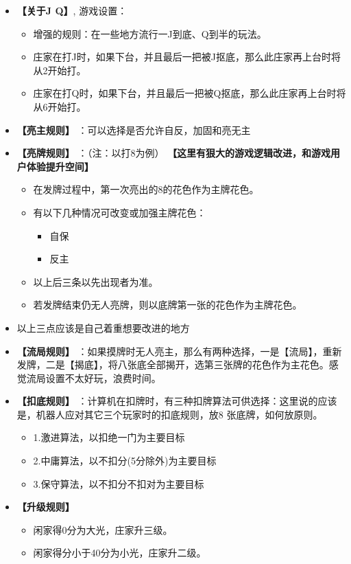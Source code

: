 \documentclass[9pt, b5paper]{article}
\begin{document}
\begin{itemize}
\item \textbf{【关于J Q】}, 游戏设置： 
\begin{itemize}
\item 增强的规则：在一些地方流行一J到底、Q到半的玩法。
\item 庄家在打J时，如果下台，并且最后一把被J抠底，那么此庄家再上台时将从2开始打。
\item 庄家在打Q时，如果下台，并且最后一把被Q抠底，那么此庄家再上台时将从6开始打。
\end{itemize}
\item \textbf{【亮主规则】} ：可以选择是否允许自反，加固和亮无主
\item \textbf{【亮牌规则】} ：（注：以打8为例） \textbf{【这里有狠大的游戏逻辑改进，和游戏用户体验提升空间】}
\begin{itemize}
\item 在发牌过程中，第一次亮出的8的花色作为主牌花色。
\item 有以下几种情况可改变或加强主牌花色：
\begin{itemize}
\item 自保
\item 反主
\end{itemize}
\item 以上后三条以先出现者为准。
\item 若发牌结束仍无人亮牌，则以底牌第一张的花色作为主牌花色。
\end{itemize}
\item 以上三点应该是自己着重想要改进的地方
\item \textbf{【流局规则】} ：如果摸牌时无人亮主，那么有两种选择，一是【流局】，重新发牌，二是【揭底】，将八张底全部揭开，选第三张牌的花色作为主花色。感觉流局设置不太好玩，浪费时间。
\item \textbf{【扣底规则】} ：计算机在扣牌时，有三种扣牌算法可供选择：这里说的应该是，机器人应对其它三个玩家时的扣底规则，放8 张底牌，如何放原则。
\begin{itemize}
\item 1.激进算法，以扣绝一门为主要目标
\item 2.中庸算法，以不扣分(5分除外)为主要目标
\item 3.保守算法，以不扣分不扣对为主要目标
\end{itemize}
\item \textbf{【升级规则】}
\begin{itemize}
\item 闲家得0分为大光，庄家升三级。
\item 闲家得分小于40分为小光，庄家升二级。

\end{itemize}
\end{itemize}
\end{document}
